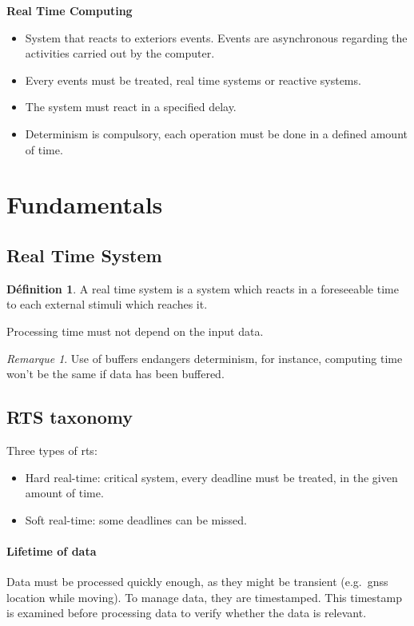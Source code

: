 \documentclass[10pt]{article}
\theoremstyle{plain}
\theoremstyle{definition}
\newtheorem{defn}{Définition}
\theoremstyle{remark}
\newtheorem{rem}{Remarque}
\begin{document}
\begin{center}
	\Large\textbf{Real Time Computing}
\end{center}
\begin{itemize}
	\item System that reacts to exteriors events. Events are
		asynchronous regarding the activities carried out by the computer.
	\item Every events must be treated, real time systems or reactive systems.
	\item The system must react in a specified delay.
	\item Determinism is compulsory, each operation must be done in a defined
		amount of time.
\end{itemize}

\section{Fundamentals}
\subsection{Real Time System}
\begin{defn}
	A real time system is a system which reacts in a foreseeable time to each
	external stimuli which reaches it.

	Processing time must not depend on the input data.
\end{defn}
\begin{rem}
	Use of buffers endangers determinism, for instance, computing time won't be
	the same if data has been buffered.
\end{rem}

\subsection{RTS taxonomy}
Three types of rts:
\begin{itemize}
	\item Hard real-time: critical system, every deadline must be treated, in 
		the given amount of time.
	\item Soft real-time: some deadlines can be missed.
\end{itemize}

\paragraph{Lifetime of data}
Data must be processed quickly enough, as they might be transient (e.g.\ gnss
location while moving). To manage data, they are timestamped. This timestamp is
examined before processing data to verify whether the data is relevant.
\end{document}
